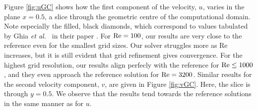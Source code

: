 \documentclass[final,3p,twocolumn]{elsarticle}
\begin{document}
Figure \ref{fig:uGC} shows how the first component of the velocity, $u$, varies
in the plane $x=0.5$, a slice through the geometric centre of the computational
domain. Note especially the filled, black diamonds, which correspond to values
tabulated by Ghia {\em et al.\ } in their paper \cite{ghia1982high}. For ${\rm
Re} = 100$, our results are very close to the reference even for the smallest
grid sizes. Our solver struggles more as Re increases, but it is still evident
that grid refinement gives convergence. For the highest grid resolution, our
results align perfecly with the reference for ${\rm Re} \leq 1000$, and they
even approach the reference solution for ${\rm Re} = 3200$. Similar results for
the second velocity component, $v$, are given in Figure \ref{fig:vGC}. Here,
the slice is through $y=0.5$. We observe that the results tend towards the
reference solutions in the same manner as for $u$. 
\end{document}
